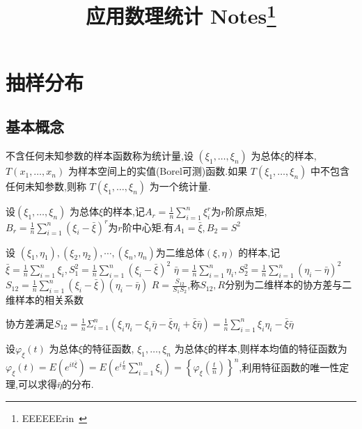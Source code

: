 \documentclass[10pt]{yerbaformat}
\title{应用数理统计 Notes\footnote{EEEEEErin~}}
\date{}
\begin{document}
\author{}
\maketitle
\tableofcontents
\newpage

\section{抽样分布}
\subsection{基本概念}

\begin{definition}[统计量]
    不含任何未知参数的样本函数称为统计量,设 $\left(\xi_{1}, \ldots, \xi_{n}\right)$ 为总体$\xi$的样本,$T\left(x_{1}, \ldots, x_{n}\right)$ 为样本空间上的实值(Borel可测)函数.如果 $T\left(\xi_{1}, \ldots, \xi_{n}\right)$ 中不包含任何未知参数,则称 $T\left(\xi_{1}, \ldots, \xi_{n}\right)$ 为一个统计量.
\end{definition}

\begin{definition}[矩]
    设$\left(\xi_{1}, \ldots, \xi_{n}\right)$ 为总体$\xi$的样本,记$A_{r}=\frac{1}{n} \sum_{i=1}^{n} \xi_{i}^{r}$为$r$阶原点矩,$ B_{r}=\frac{1}{n} \sum_{i=1}^{n}\left(\xi_{i}-\bar{\xi}\right)^{r}$为$r$阶中心矩.有$A_{1}=\bar{\xi}, B_{2}=S^{2}$
\end{definition}

\begin{definition}[相关系数]
    设 $\left(\xi_{1}, \eta_{1}\right),\left(\xi_{2}, \eta_{2}\right), \cdots,\left(\xi_{n}, \eta_{n}\right)$为二维总体$(\xi, \eta)$ 的样本,记$\bar{\xi}=\frac{1}{n} \sum_{i=1}^{n} \xi_{i}, S_{1}^{2}=\frac{1}{n} \sum_{i=1}^{n}\left(\xi_{i}-\bar{\xi}\right)^{2}$
    $\bar{\eta}=\frac{1}{n} \sum_{i=1}^{n} \eta_{i}, S_{2}^{2}=\frac{1}{n} \sum_{i=1}^{n}\left(\eta_{i}-\bar{\eta}\right)^{2}$
    $S_{12}=\frac{1}{n} \sum_{i=1}^{n}\left(\xi_{i}-\bar{\xi}\right)\left(\eta_{i}-\bar{\eta}\right)$
    $R=\frac{S_{12}}{S_{1} S_{2}}$,称$S_{12}, R$分别为二维样本的协方差与二维样本的相关系数
\end{definition}

\par 协方差满足$S_{12}=\frac{1}{n} \Sigma_{i=1}^{n}\left(\xi_{i} \eta_{i}-\xi_{i} \bar{\eta}-\bar{\xi} \eta_{i}+\bar{\xi} \bar{\eta}\right)=\frac{1}{n} \sum_{i=1}^{n} \xi_{i} \eta_{i}-\bar{\xi} \bar{\eta}$

\begin{definition}[特征函数]
    设$\varphi_{\xi}(t)$ 为总体$\xi$的特征函数, $\xi_{1}, \ldots, \xi_{n}$ 为总体$\xi$的样本,则样本均值的特征函数为$\varphi_{\xi}(t)=E\left(e^{i t \bar{\xi}}\right)=E\left(e^{i \frac{t}{n}} \sum_{i=1}^{n} \xi_{i}\right)=\left\{\varphi_{\xi}\left(\frac{t}{n}\right)\right\}^{n}$,利用特征函数的唯一性定理,可以求得$\bar{\eta}$的分布.
\end{definition}
\end{document}
